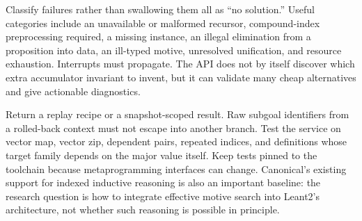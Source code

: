 Classify failures rather than swallowing them all as ``no solution.'' Useful categories include an unavailable or malformed recursor, compound-index preprocessing required, a missing instance, an illegal elimination from a proposition into data, an ill-typed motive, unresolved unification, and resource exhaustion. Interrupts must propagate. The API does not by itself discover which extra accumulator invariant to invent, but it can validate many cheap alternatives and give actionable diagnostics.

Return a replay recipe or a snapshot-scoped result. Raw subgoal identifiers from a rolled-back context must not escape into another branch. Test the service on vector map, vector zip, dependent pairs, repeated indices, and definitions whose target family depends on the major value itself. Keep tests pinned to the toolchain because metaprogramming interfaces can change. Canonical's existing support for indexed inductive reasoning is also an important baseline: the research question is how to integrate effective motive search into Leant2's architecture, not whether such reasoning is possible in principle.\cite{canonical}
